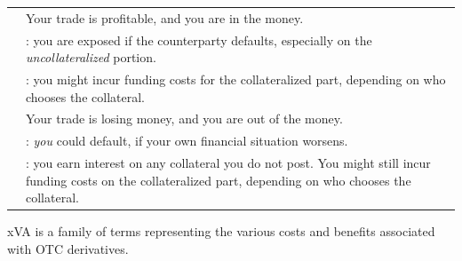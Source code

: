 \begin{center}
\footnotesize
\begin{tabular}{L{3.0cm} L{11.5cm}}
\toprule
{} & Your trade is profitable, and you are in the money. \\
 & : you are exposed if the counterparty defaults,
especially on the \emph{uncollateralized} portion. \\
 & : you might incur funding costs for the collateralized
part, depending on who chooses the collateral. \\
\midrule
{} & Your trade is losing money, and you are out of the money. \\
 & : \emph{you} could default, if your own financial
situation worsens. \\
 & : you earn interest on any collateral you do not post.
You might still incur funding costs on the collateralized part, depending on who
chooses the collateral. \\
\bottomrule
\end{tabular}
\end{center}


xVA is a family of terms representing the various costs and benefits associated
with OTC derivatives.

